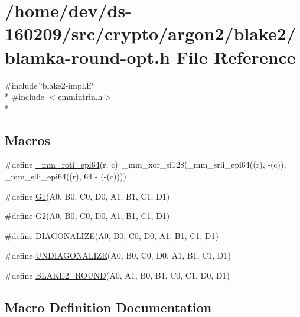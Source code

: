 \hypertarget{blamka-round-opt_8h}{}\section{/home/dev/ds-\/160209/src/crypto/argon2/blake2/blamka-\/round-\/opt.h File Reference}
\label{blamka-round-opt_8h}
{\ttfamily \#include \char`\"{}blake2-\/impl.\+h\char`\"{}}\\*
{\ttfamily \#include $<$emmintrin.\+h$>$}\\*
\subsection*{Macros}
\begin{DoxyCompactItemize}
\item 
\#define \hyperlink{blamka-round-opt_8h_a4b2c5cdf0a7ce77d4b1acfe1b4fc7883}{\+\_\+mm\+\_\+roti\+\_\+epi64}(r,  c)~\+\_\+mm\+\_\+xor\+\_\+si128(\+\_\+mm\+\_\+srli\+\_\+epi64((r), -\/(c)), \+\_\+mm\+\_\+slli\+\_\+epi64((r), 64 -\/ (-\/(c))))
\item 
\#define \hyperlink{blamka-round-opt_8h_ac5393222f6177ce751b9f0426f88cfa7}{G1}(A0,  B0,  C0,  D0,  A1,  B1,  C1,  D1)
\item 
\#define \hyperlink{blamka-round-opt_8h_aa720bd2ea16e8f47866b15c03e53444d}{G2}(A0,  B0,  C0,  D0,  A1,  B1,  C1,  D1)
\item 
\#define \hyperlink{blamka-round-opt_8h_a4f5153b33e2d6c8a2a0b5084efa1fe0e}{D\+I\+A\+G\+O\+N\+A\+L\+I\+Z\+E}(A0,  B0,  C0,  D0,  A1,  B1,  C1,  D1)
\item 
\#define \hyperlink{blamka-round-opt_8h_a8c3e6d429c117a457d672f91bba5343c}{U\+N\+D\+I\+A\+G\+O\+N\+A\+L\+I\+Z\+E}(A0,  B0,  C0,  D0,  A1,  B1,  C1,  D1)
\item 
\#define \hyperlink{blamka-round-opt_8h_a49f46571273cbbead52b2085e973c5ed}{B\+L\+A\+K\+E2\+\_\+\+R\+O\+U\+N\+D}(A0,  A1,  B0,  B1,  C0,  C1,  D0,  D1)
\end{DoxyCompactItemize}


\subsection{Macro Definition Documentation}
\hypertarget{blamka-round-opt_8h_a4b2c5cdf0a7ce77d4b1acfe1b4fc7883}{}
